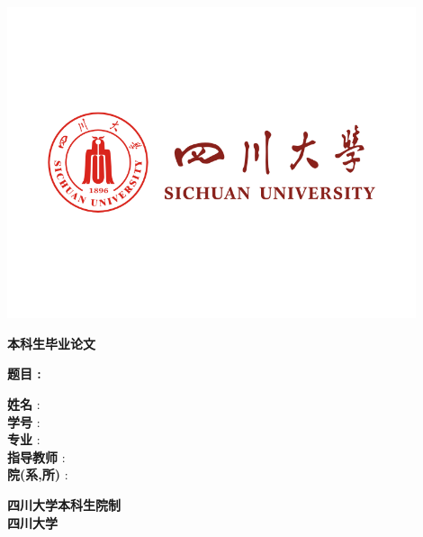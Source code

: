 \begin{titlepage}

\begin{CJK*}{UTF8}{gkai}
    
\centering
    
    \includegraphics[width=12cm, keepaspectratio]{figures/scu.png}
    
\vspace{0.5cm}    
    
    {\fontsize{30}{60}
    \textbf{本科生毕业论文}}
    
\vspace{1.8cm}
\Large

    \textbf{题目 : \mytitle}
    
\vspace{1.8cm}
    
\flushleft
\setlength{\leftskip}{3cm}
\Large

    \textbf{姓名} \hspace{1.3cm}        : \hspace{0.3cm}  \authorchinese \\
    \textbf{学号} \hspace{1.3cm}        : \hspace{0.3cm}  \studentid \\
    \textbf{专业} \hspace{1.3cm}        : \hspace{0.3cm}  \majorchinese \\
    \textbf{指导教师} \hspace{0.05cm}   : \hspace{0.3cm}  \advisorchinese \\
    \textbf{院(系,所)} \hspace{0.1cm}   : \hspace{0.3cm}  \schoolchinese

\vfill
\centering

    \textbf{
    四川大学本科生院制 \\
    四川大学 \\
    \mydatechinese}

\end{CJK*}

\end{titlepage}